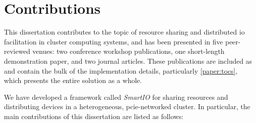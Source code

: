 \section{Contributions}
This dissertation contributes to the topic of resource sharing and distributed \gls{io} facilitation in cluster computing systems, and has been presented in five peer-reviewed venues: two conference workshop publications, one short-length demonstration paper, and two journal articles.
These publications are included as  and contain the bulk of the implementation details, particularly \cref{paper:tocs}, which presents the entire solution as a whole.

We have developed a framework called \emph{SmartIO} for sharing resources and distributing devices in a heterogeneous, \gls{pcie}-networked cluster.
%
In particular, the main contributions of this dissertation are listed as follows:
